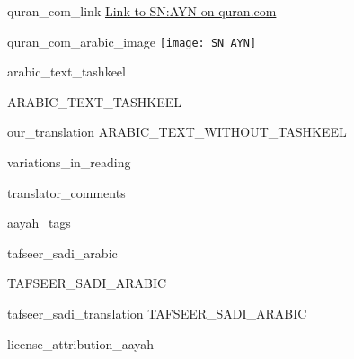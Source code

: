\begin{comment}
The following strings are to be replaced by a script, in order to use this file as a template (all upper case):-
* sN = sūrah number, without leading zeros
* aYN = āyah number, without leading zeros
* aRABIC_TEXT_TASHKEEL = the text of the aayah, with tashkeel marks
* aRABIC_TEXT_WITHOUT_TASHKEEL = the text of the aayah, without tashkeel marks
* tAFSEER_SADI_ARABIC = the tafseer of the aayah from as-sa'di
\end{comment}
\begin{comment}
The following tags are declared here:-
quran_com_link
quran_com_arabic_image
arabic_text_tashkeel
our_translation
variations_in_reading
translator_comments
aayah_tags
tafseer_sadi_arabic
tafseer_sadi_translation
license_attribution_aayah
\end{comment}
\begin{taggedblock}{quran_com_link}
\href{http://quran.com/SN/AYN}{Link to SN:AYN on quran.com}
\end{taggedblock}
\begin{taggedblock}{quran_com_arabic_image}
\texttt{[image: SN\_AYN]}
\end{taggedblock}
\begin{taggedblock}{arabic_text_tashkeel}
\begin{Arabic}
ARABIC_TEXT_TASHKEEL
\end{Arabic}
\end{taggedblock}
\begin{taggedblock}{our_translation}
ARABIC_TEXT_WITHOUT_TASHKEEL
\end{taggedblock}
\begin{taggedblock}{variations_in_reading}
\end{taggedblock}
\begin{taggedblock}{translator_comments}
\end{taggedblock}
\begin{taggedblock}{aayah_tags}
\end{taggedblock}
\begin{taggedblock}{tafseer_sadi_arabic}
\begin{Arabic}
TAFSEER_SADI_ARABIC
\end{Arabic}
\end{taggedblock}
\begin{taggedblock}{tafseer_sadi_translation}
TAFSEER_SADI_ARABIC
\end{taggedblock}
\begin{taggedblock}{license_attribution_aayah}

\end{taggedblock}
\begin{comment}
Please use the following for footnotes:- Sample\footnoteQ{Text of Qur'an footnote goes here.}.
Sample\footnoteT{Text of Tafseer footnote goes here.}.
\end{comment}